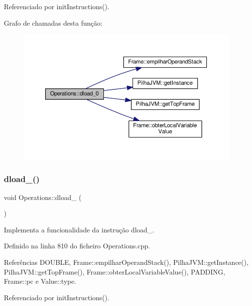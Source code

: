 Referenciado por init\+Instructions().

Grafo de chamadas desta função\+:
\nopagebreak
\begin{figure}[H]
\begin{center}
\leavevmode
\includegraphics[width=350pt]{classOperations_a176a81199439e0b22d206c72ea4a1fba_cgraph}
\end{center}
\end{figure}
\mbox{\label{classOperations_a64632251d88964ff4da0d981103e099c}} 
\subsubsection{\texorpdfstring{dload\+\_()}{dload\_1()}}
{\footnotesize\ttfamily void Operations\+::dload\+\_ (\begin{DoxyParamCaption}{ }\end{DoxyParamCaption})\hspace{0.3cm}{\ttfamily [private]}}



Implementa a funcionalidade da instrução dload\+\_. 



Definido na linha 810 do ficheiro Operations.\+cpp.



Referências D\+O\+U\+B\+LE, Frame\+::empilhar\+Operand\+Stack(), Pilha\+J\+V\+M\+::get\+Instance(), Pilha\+J\+V\+M\+::get\+Top\+Frame(), Frame\+::obter\+Local\+Variable\+Value(), P\+A\+D\+D\+I\+NG, Frame\+::pc e Value\+::type.



Referenciado por init\+Instructions().

